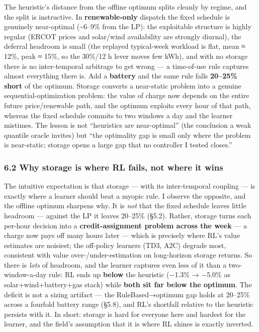 \documentclass[
  11pt,
]{article}
\begin{document}
The heuristic's distance from the offline optimum splits cleanly by
regime, and the split is instructive. In \textbf{renewable-only}
dispatch the fixed schedule is genuinely near-optimal
(\textasciitilde6--9\% from the LP): the exploitable structure is highly
regular (ERCOT prices and solar/wind availability are strongly diurnal),
the deferral headroom is small (the replayed typical-week workload is
flat, mean ≈ 12\%, peak ≈ 15\%, so the 30\%/12 h lever moves few kWh),
and with no storage there is no inter-temporal arbitrage to get wrong
--- a time-of-use rule captures almost everything there is. Add a
\textbf{battery} and the same rule falls \textbf{20--25\% short} of the
optimum. Storage converts a near-static problem into a genuine
sequential-optimization problem: the value of charge now depends on the
entire future price/renewable path, and the optimum exploits every hour
of that path, whereas the fixed schedule commits to two windows a day
and the learner mistimes. The lesson is not ``heuristics are
near-optimal'' (the conclusion a weak quantile oracle invites) but ``the
optimality gap is small only where the problem is near-static; storage
opens a large gap that no controller I tested closes.''

\subsubsection{6.2 Why storage is where RL fails, not where it
wins}\label{why-storage-is-where-rl-fails-not-where-it-wins}

The intuitive expectation is that storage --- with its inter-temporal
coupling --- is exactly where a learner should beat a myopic rule. I
observe the opposite, and the offline optimum sharpens why. It is
\emph{not} that the fixed schedule leaves little headroom --- against
the LP it leaves 20--25\% (§5.2). Rather, storage turns each per-hour
decision into a \textbf{credit-assignment problem across the week} --- a
charge now pays off many hours later --- which is precisely where RL's
value estimates are noisiest; the off-policy learners (TD3, A2C) degrade
most, consistent with value over-/under-estimation on long-horizon
storage returns. So there is \emph{lots} of headroom, and the learner
captures even less of it than a two-window-a-day rule: RL ends up
\textbf{below} the heuristic (−1.3\% → −5.0\% as solar+wind+battery+gas
stack) while \textbf{both sit far below the optimum}. The deficit is not
a sizing artifact --- the RuleBased→optimum gap holds at 20--25\% across
a fourfold battery range (§5.8), and RL's shortfall relative to the
heuristic persists with it. In short: storage is hard for everyone here
and hardest for the learner, and the field's assumption that it is where
RL shines is exactly inverted.
\end{document}
